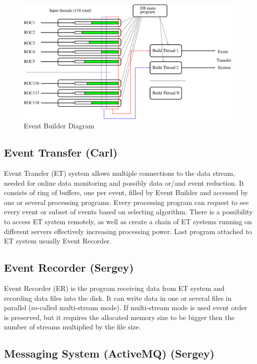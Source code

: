 \begin{figure}[hbt]
	\centering
	\includegraphics[width=1.0\columnwidth,keepaspectratio]{img/eb_diagram.pdf}
	\caption{Event Builder Diagram}
	\label{fig:eb_diagram}
\end{figure}


\subsection{Event Transfer (Carl)}

Event Transfer (ET) system allows multiple connections to the data stream, needed for online data monitoring and possibly data or/and event reduction. It consists of ring of buffers, one per event, filled by Event Builder and accessed by one or several processing programs. Every processing program can request to see every event or subset of events based on selecting algorithm. There is a possibility to access ET system remotely, as well as create a chain of ET systems running on different servers effectively increasing processing power. Last program attached to ET system usually Event Recorder.

\subsection{Event Recorder (Sergey)}

Event Recorder (ER) is the program receiving data from ET system and recording data files into the disk. It can write data in one or several files in parallel (so-called multi-stream mode). If multi-stream mode is used event order is preserved, but it requires the allocated memory size to be bigger then the number of streams multiplied by the file size.


\subsection{Messaging System (ActiveMQ) (Sergey)}

